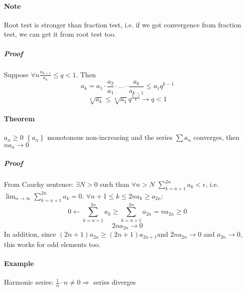 \paragraph{Note} Root test is stronger than fraction test, i.e. if we got convergence from fraction test, we can get it from root test too.
\subparagraph{Proof} Suppose $\forall n \frac{a_{n+1}}{a_n} \leq q < 1$. Then
$$a_k = a_1 \cdot \frac{a_2}{a_1} \cdot \dots \cdot \frac{a_k}{a_{k-1}} \leq a_1 q^{k-1}$$
$$\sqrt[k]{a_k} \leq \sqrt[k]{a_1} q^{\frac{k-1}{k}} \to q < 1$$
\paragraph{Theorem} $a_n \geq 0$ $\left\{ a_n\right\}$ monotonous non-increasing and the series $\sum a_n$ converges, then $na_n \to 0$
\subparagraph{Proof}
From Cauchy sentence: $\exists N>0$ such than $\forall n > N$ $\sum_{k=n+1}^{2n} a_k < \epsilon$, i.e. $\lim_{n\to \infty} \sum_{k=n+1}^{2n} a_k = 0$. $\forall n+1\leq k \leq 2n a_k \geq a_{2n}$:
$$0 \leftarrow \sum_{k=n+1}^{2n} a_k  \geq \sum_{k=n+1}^{2n} a_{2n} = na_{2n} \geq 0$$
$$2na_{2n} \to 0$$
In addition, since $(2n+1)a_{2n} \geq (2n+1)a_{2n+1}$and $2na_{2n}  \to 0$ and $a_{2n} \to 0$, this works for odd elements too.
\paragraph{Example} Harmonic series: $\frac{1}{n} \cdot n \neq 0 \Rightarrow$ series diverges 